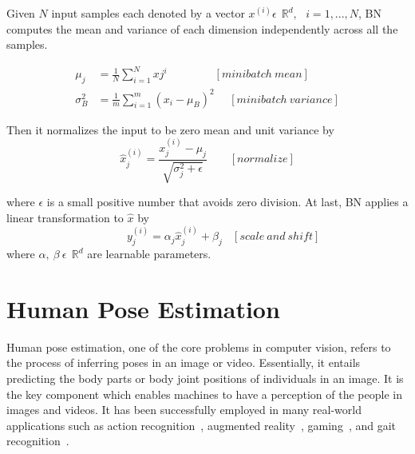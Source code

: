 Given $N$ input samples each denoted by a vector $x^{(i)}\epsilon~~\mathbb {R}^d,~~~i = 1, . . . , N$, BN computes the mean and variance of each dimension independently across all the samples.

\begin{equation}
	\begin{split}
	  \mu_{j} &= \frac{1}{N}\sum_{i=1}^{N}x{j}^{i}~~~~~~~~~~~~~~~~~~~[minibatch~mean] \\
	  \sigma_{B}^{2} &= \frac{1}{m}\sum_{i=1}^{m}{(x_{i}-\mu_{B})}^2~~~~~~[minibatch~variance]
	\end{split}
\end{equation}

Then it normalizes the input to be zero mean and unit variance by
\begin{equation}
\hat{x}_{j}^{(i)} = \frac{x_{j}^{(i)} - \mu_{j}}{\sqrt{\sigma_{j}^2+\epsilon}} ~~~~~~~~~[normalize]
\end{equation}

where $\epsilon$ is a small positive number that avoids zero division. At last, BN applies a linear transformation to $\hat{x}$ by
\begin{equation}
~~~~~~~~~~~~~y_{j}^{(i)}  = \alpha_{j}\hat{x}_{j}^{(i)} + \beta_{j}~~~~[scale~and~shift]
\end{equation}
where $\alpha,~\beta~\epsilon~~\mathbb {R}^d$ are learnable parameters.



\section{Human Pose Estimation} \label{sec:pose_estimation}
Human pose estimation, one of the core problems in computer vision, refers to the process of inferring poses in an image or video. Essentially, it entails predicting the body parts or body joint positions of individuals in an image.
It is the key component which enables machines to have a perception of the people in images and videos. It has been successfully employed in many real-world applications such as action recognition~\cite{Song_17}, augmented reality~\cite{Marchand_16}, gaming~\cite{Ke_10}, and gait recognition~\cite{Liao_19}. 


